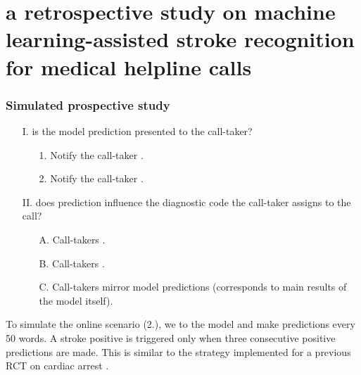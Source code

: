 

\section[A Retrospective Study on Machine Learning-Assisted Stroke Recognition for Medical Helpline Calls]{a retrospective study on machine learning-assisted stroke recognition for medical helpline calls}\label{extra:retrospective}


\begin{frame}
    \frametitle{Simulated prospective study}
    \begin{enumerate}
        \item[I.]  is the model prediction presented to the call-taker?
        \begin{enumerate}
            \item[1.] Notify the call-taker .
            \item[2.] Notify the call-taker .
        \end{enumerate}
        \item[II.]  does prediction influence the diagnostic code the call-taker assigns to the call?
        \begin{enumerate}[label=\Alph*.]
            \item[A.] Call-takers .
            \item[B.] Call-takers .
            \item[C.] Call-takers mirror model predictions (corresponds to main results of the model itself).
        \end{enumerate}
    \end{enumerate}
    \vspace{0.5em}
    To simulate the online scenario (2.), we  to the model and make predictions every 50 words. 
    A stroke positive is triggered only when three consecutive positive predictions are made. 
    This is similar to the strategy implemented for a previous RCT on cardiac arrest \cite{cite15}.

        

\end{frame}
